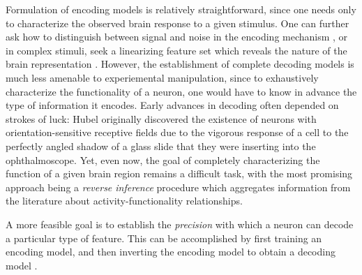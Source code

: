\documentclass[12pt]{article}
\begin{document}
Formulation of encoding models is relatively straightforward, since
one needs only to characterize the observed brain response to a given
stimulus.  One can further ask how to distinguish between signal and
noise in the encoding mechanism \cite{Nelken2005}, or in complex
stimuli, seek a linearizing feature set which reveals the nature of
the brain representation \cite{Naselaris2011}.  However, the
establishment of complete decoding models is much less amenable to
experiemental manipulation, since to exhaustively characterize the
functionality of a neuron, one would have to know in advance the type
of information it encodes.  Early advances in decoding often depended
on strokes of luck: Hubel \cite{Hubel1982} originally discovered the
existence of neurons with orientation-sensitive receptive fields due
to the vigorous response of a cell to the perfectly angled shadow of a
glass slide that they were inserting into the ophthalmoscope.  Yet,
even now, the goal of completely characterizing the function of a
given brain region remains a difficult task, with the most promising
approach being a \emph{reverse inference}
procedure \cite{Poldrack2006} which aggregates information from the
literature about activity-functionality relationships.

A more feasible goal is to establish the \emph{precision} with which a
neuron can decode a particular type of feature.  This can be
accomplished by first training an encoding model, and then inverting
the encoding model to obtain a decoding model \cite{Naselaris2011}.



{}

\end{document}
